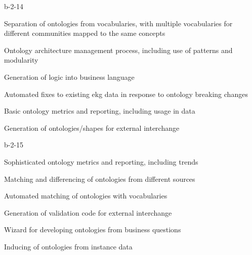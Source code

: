 \begin{level-assessment}{b-2-1}{4}

    \item Separation of ontologies from vocabularies, with multiple vocabularies for different communities
          mapped to the same concepts
    \item Ontology architecture management process, including use of patterns and modularity
    \item Generation of logic into business language
    \item Automated fixes to existing \gls{ekg} data in response to ontology breaking changes
    \item Basic ontology metrics and reporting, including usage in data
    \item Generation of ontologies/shapes for external interchange

\end{level-assessment}

\begin{level-assessment}{b-2-1}{5}

    \item Sophisticated ontology metrics and reporting, including trends
    \item Matching and differencing of ontologies from different sources
    \item Automated matching of ontologies with vocabularies
    \item Generation of validation code for external interchange
    \item Wizard for developing ontologies from business questions
    \item Inducing of ontologies from instance data

\end{level-assessment}
